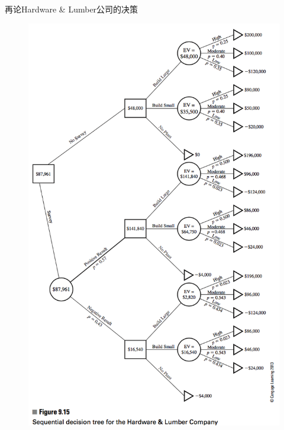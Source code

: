 \documentclass[UTF8]{ctexbeamer}
\begin{document}
\begin{frame}{再论Hardware \& Lumber公司的决策}
  
  \begin{figure}
    \includegraphics[height=0.8\textheight{}]{9_15.png}
  \end{figure}

\end{frame}
\end{document}

